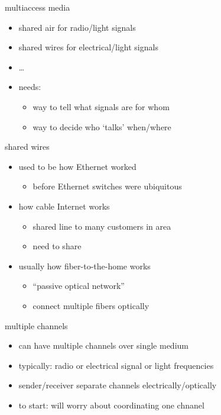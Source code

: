 \begin{frame}{multiaccess media}
    \begin{itemize}
    \item shared air for radio/light signals
    \item shared wires for electrical/light signals
    \item \ldots
    \vspace{.5cm}
    \item needs:
        \begin{itemize}
        \item way to tell what signals are for whom
        \item way to decide who `talks' when/where
        \end{itemize}
    \end{itemize}
\end{frame}

\begin{frame}{shared wires}
    \begin{itemize}
    \item used to be how Ethernet worked
        \begin{itemize}
        \item before Ethernet switches were ubiquitous
        \end{itemize}
    \item how cable Internet works
        \begin{itemize}
        \item shared line to many customers in area
        \item need to share
        \end{itemize}
    \item usually how fiber-to-the-home works
        \begin{itemize}
        \item ``passive optical network''
        \item connect multiple fibers optically
        \end{itemize}
    \end{itemize}
\end{frame}

\begin{frame}{multiple channels}
    \begin{itemize}
    \item can have multiple channels over single medium
    \item typically: radio or electrical signal or light frequencies
    \item sender/receiver separate channels electrically/optically
    \vspace{.5cm}
    \item to start: will worry about coordinating one chnanel
    \end{itemize}
\end{frame}

